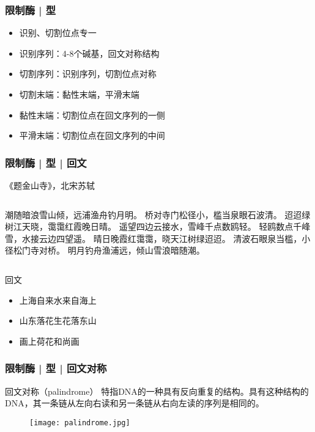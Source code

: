 \begin{frame}
  \frametitle{限制酶 | \alert{型}}
  \begin{itemize}
    \item 识别、切割位点专一
    \item 识别序列：4-8个碱基，回文对称结构
    \item 切割序列：识别序列，切割位点对称
    \item 切割末端：黏性末端，平滑末端
    \item 黏性末端：切割位点在回文序列的一侧
    \item 平滑末端：切割位点在回文序列的中间
  \end{itemize}
\end{frame}

\begin{frame}
  \frametitle{限制酶 | 型 | 回文}
  \begin{block}{《题金山寺》，北宋\textbullet 苏轼}
  \begin{columns}
潮随暗浪雪山倾，远浦渔舟钓月明。
桥对寺门松径小，槛当泉眼石波清。
迢迢绿树江天晓，霭霭红霞晚日晴。
遥望四边云接水，雪峰千点数鸥轻。
    \pause
轻鸥数点千峰雪，水接云边四望遥。
晴日晚霞红霭霭，晓天江树绿迢迢。
清波石眼泉当槛，小径松门寺对桥。
明月钓舟渔浦远，倾山雪浪暗随潮。
  \end{columns}
  \end{block}
  \pause
  \begin{block}{回文}
    \begin{itemize}
      \item 上海自来水来自海上
      \item 山东落花生花落东山
      \item 画上荷花和尚画
    \end{itemize}
  \end{block}
\end{frame}

\begin{frame}
  \frametitle{限制酶 | 型 | 回文对称}
  \begin{block}{回文对称（palindrome）}
    特指DNA的一种具有反向重复的结构。具有这种结构的DNA，其一条链从左向右读和另一条链从右向左读的序列是相同的。
  \end{block}
  \begin{figure}
    \centering
    \texttt{[image: palindrome.jpg]}
  \end{figure}
\end{frame}

